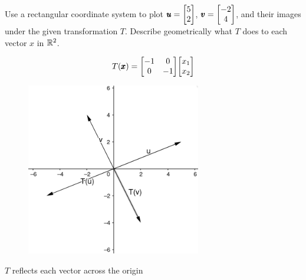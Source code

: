 \documentclass{../mathhomework}
\newenvironment{Mat}{\begin{bmatrix}}{\end{bmatrix}}
\begin{document}
\newpage

\begin{problem}[1.8\#13]
    Use a rectangular coordinate system to plot $\Vect{u} = \begin{Mat}
        5 \\ 2
    \end{Mat}$, $\Vect{v} = \begin{Mat}
        -2 \\ 4
    \end{Mat}$, and their images under the given transformation $T$. Describe geometrically what $T$ does to each vector $x$ in $\mathbb{R}^2$.

    \begin{equation*}
        T(\Vect{x}) = \begin{Mat}
            -1 & 0 \\
            0 & -1
        \end{Mat}
        \begin{Mat}
            x_1 \\ x_2
        \end{Mat}
    \end{equation*}

    \begin{solution}
        \begin{figure}[h!]
            \begin{center}
                \includegraphics[width=3in]{figures/1_8_13_solution.png}
            \end{center}
        \end{figure}
        
        $T$ reflects each vector across the origin
    \end{solution}
\end{problem}
\end{document}

